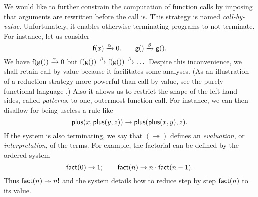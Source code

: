 We would like to further constrain the computation of function calls
by imposing that arguments are rewritten before the call is. This
strategy is named \emph{call\hyp{}by\hyp{}value}.\label{def:call-by-value} Unfortunately, it
enables otherwise terminating programs to not terminate. For instance,
let us consider
\begin{equation*}
\textsf{f}(x) \xrightarrow{\smash{\alpha}} 0.\qquad
\textsf{g}() \xrightarrow{\smash{\beta}} \textsf{g}().
\end{equation*}
We have \(\textsf{f}(\textsf{g}()) \xrightarrow{\smash{\alpha}} 0\) but
\(\textsf{f}(\textsf{g}()) \xrightarrow{\smash{\beta}} \textsf{f}(\textsf{g}())
\xrightarrow{\smash{\beta}} \dots\) Despite this inconvenience, we
shall retain call\hyp{}by\hyp{}value because it facilitates some
analyses. (As an illustration of a reduction strategy more powerful
than call-by-value, see the purely functional language \Haskell
\citep{DoetsVanEijck_2004}.) Also it allows us to restrict the shape
of the left\hyp{}hand sides, called \emph{patterns}, to one, outermost function call. For instance, we
can then disallow for being useless a rule like
\begin{equation*}
\textsf{plus}(x,\textsf{plus}(y,z)) \rightarrow
\textsf{plus}(\textsf{plus}(x,y),z).
\end{equation*}
If the system is also terminating, we say that
\((\twoheadrightarrow)\) defines an \emph{evaluation}, or \emph{interpretation}, of the terms. For example,
the factorial
 can be defined by the ordered
system
\begin{equation}
\textsf{fact}(0) \rightarrow 1;\qquad
\textsf{fact}(n) \rightarrow n \cdot \textsf{fact}(n-1).
\label{def:fact}
\end{equation}
Thus \(\textsf{fact}(n) \twoheadrightarrow n!\) and the system details
how to reduce step by step \(\textsf{fact}(n)\) to its value.

